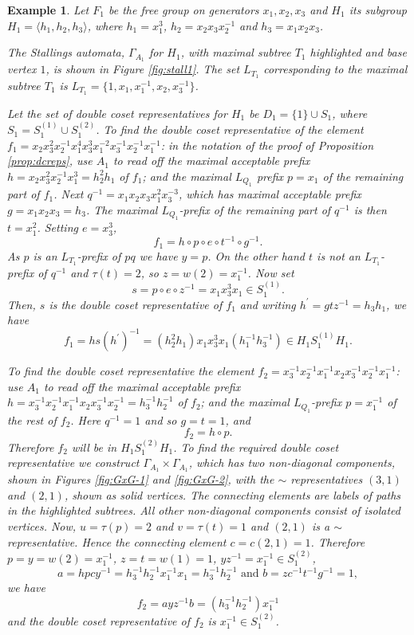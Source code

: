 \documentclass[a4paper,12pt]{article}
\newcommand{\G}{\Gamma }
\renewcommand{\t}{\tau }
\newtheorem{exam}[theorem]{Example}
\newenvironment{example}{\begin{exam} \rm}{\end{exam}}
\numberwithin{equation}{section}
\numberwithin{figure}{section}
\newcommand{\la}{\langle}
\newcommand{\ra}{\rangle}
\begin{document}
\begin{example}\label{ex:f_1}
Let $F_1$ be the free group on generators $x_1,x_2,x_3$ and $H_1$ its
subgroup $H_1=\la
h_1,h_2,h_3\ra$, where  $h_1= x_1^3$, $h_2=x_2x_3x_2^{-1}$ and
$h_3=x_1x_2x_3$.

The Stallings automata, $\G_{A_1}$ for $H_1$,
with maximal subtree $T_1$ highlighted and base vertex $1$, is shown
in Figure %
 \ref{fig:stall1}.
The set $L_{T_1}$ corresponding to the maximal subtree  $T_1$ is
 $L_{T_1}=\{1,x_1,x_1^{-1},x_2,x_3^{-1} \}$.

Let the set of double coset representatives for $H_1$ be $D_1=\{1\}\cup S_1$, 
where $S_1=  
S_1^{(1)}
\cup S_1^{(2)}$.
To find the double coset representative of the element $f_1 =
x_2x_3^2x_2^{-1} x_1^4x_3^3x_1^{-2}x_3^{-1}x_2^{-1}x_1^{-1}$: in
the notation of the proof of Proposition \ref{prop:dcreps}, use
${A_1}$ to read off the maximal acceptable prefix $h=x_2x_3^2x_2^{-1} x_1^3
=h_2^2h_1$
of $f_1$; and
the maximal $L_{Q_1}$ prefix $p=x_1$ of the remaining part of $f_1$. Next
$q^{-1}=x_1x_2x_3x_1^2x_3^{-3}$, which has maximal acceptable prefix
$g=x_1x_2x_3=h_3$. The maximal $L_{Q_1}$-prefix of the remaining part of $q^{-1}$
is then $t=x_1^2$. Setting $e=x_3^3$,
\[f_1=h\circ p\circ e\circ t^{-1}\circ g^{-1}.\]
As $p$ is an $L_{T_1}$-prefix of $pq$ we have $y=p$. On the other hand
$t$ is not an $L_{T_1}$-prefix of $q^{-1}$ and $\t(t)=2$, so $z=w(2)=x_1^{-1}$.
Now set
\[s=p\circ e\circ z^{-1}=x_1x_3^3x_1\in S_1^{(1)}.\]
Then,  $s$ is the  double coset representative of $f_1$ and writing $h^\prime=gtz^{-1}=h_3h_1$, we have 
\[f_1=hs(h^\prime)^{-1}=(h_2^{2}h_1) x_1x_3^3x_1(h_1^{-1}h_3^{-1})\in H_1S_1^{(1)}H_1.\]

To find the double coset representative  the element
$f_2=x_3^{-1}x_2^{-1}x_1^{-1}x_2x_3^{-1}x_2^{-1}x_1^{-1}$: use
${A_1}$ to read off the maximal acceptable prefix
$h=x_3^{-1}x_2^{-1}x_1^{-1}x_2x_3^{-1}x_2^{-1}=h_3^{-1}h_2^{-1}$
of $f_2$;
and  the
maximal $L_{Q_1}$-prefix $p=x_1^{-1}$ of the rest of $f_2$.  Here
$q^{-1}=1$ and so $g=t=1$, and
\[f_2=h\circ p.\]
Therefore $f_2$ will be in $H_1S_1^{(2)}H_1$. To find the required
double coset representative we construct $\G_{A_1}\times
\G_{A_1}$, which has two non-diagonal components, shown in Figures
\ref{fig:GxG-1} and \ref{fig:GxG-2},
with the $\sim$ representatives $(3,1)$ and $(2,1)$,  shown as
solid vertices. The connecting elements are labels of paths in the
highlighted subtrees.  All other non-diagonal components consist
of isolated vertices. Now, $u=\t(p)=2$ and $v=\t(t)=1$ and $(2,1)$
is a $\sim$ representative. Hence the  connecting element
$c=c(2,1)=1$. Therefore $p=y=w(2)=x_1^{-1}$, $z=t=w(1)=1$,
$yz^{-1}=x_1^{-1}\in S_1^{(2)}$,
\[a=hpcy^{-1}=h_3^{-1}h_2^{-1}x_1^{-1}x_1=h_3^{-1}h_2^{-1}
\textrm{ and }
b=zc^{-1}t^{-1}g^{-1}=1,\]
we have 
\[f_2=a yz^{-1} b=(h_3^{-1}h_2^{-1}) x_1^{-1}\]
and the double coset representative of $f_2$ is $x_1^{-1}\in S_1^{(2)}$.
\end{example}
\end{document}
